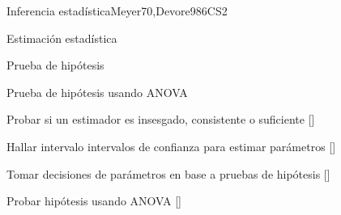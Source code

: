 \begin{syllabus}
\begin{unit}{}{Inferencia estadística}{Meyer70,Devore98}{6}{CS2}
\begin{topics}
      \item Estimación estadística
      \item Prueba de hipótesis
      \item Prueba de hipótesis usando ANOVA
   \end{topics}

   \begin{learningoutcomes}
      \item Probar si un estimador es insesgado, consistente o suficiente [\Usage]
      \item Hallar intervalo intervalos de confianza para estimar parámetros [\Usage]
      \item Tomar decisiones de parámetros en base a pruebas de hipótesis [\Usage]
      \item Probar hipótesis usando ANOVA [\Usage]
   \end{learningoutcomes}
\end{unit}








\begin{coursebibliography}
\end{coursebibliography}

\end{syllabus}
